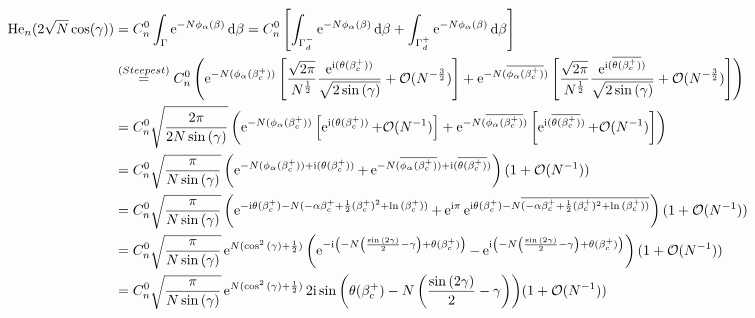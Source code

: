 \begin{equation}
 	\begin{split}
 		 \He_n(2\sqrt{N}\cos(\gamma)) &= C_n^0 \int_{\Gamma}  \ee^{-N \phi_\alpha(\beta)} \dd \beta  = C_n^0  \left[ \int_{\Gamma_d^-}  \ee^{-N \phi_\alpha(\beta)} \dd \beta + \int_{\Gamma_d^+}  \ee^{-N \phi_\alpha(\beta)} \dd \beta  \right]\\
 		 & \stackrel{(Steepest)}{=}  
 		 C_n^0 \left(
 		 \ee^{-N(\phi_\alpha(\beta_c^+))} 
 		 \left[
 		 \frac{\sqrt{2\pi}}{N^{\frac{1}{2}}}
 		 \frac{\ee^{\ii (\theta(\beta_c^+))}}{\sqrt{2\sin{(\gamma)}}} 
 		 + \Boh(N^{-\frac{3}{2}})
 		 \right]
 		 +
 		 \ee^{-N(\overline{\phi_\alpha(\beta_c^+)})} 
 		 \left[
 		 \frac{\sqrt{2\pi}}{N^{\frac{1}{2}}}
 		 \frac{\ee^{\ii (\overline{\theta(\beta_c^+)})}}{\sqrt{2\sin{(\gamma)}}}
 		 + \Boh(N^{-\frac{3}{2}})
 		 \right]   
 		 \right)
 		 \\
 		 & = C_n^0 \sqrt{\frac{2\pi}{2N\sin{(\gamma)}}} \left(
 		 \ee^{-N(\phi_\alpha(\beta_c^+))} 
 		 \left[
 		 \ee^{\ii(\theta(\beta_c^+))} 
 		 + \Boh(N^{-1})
 		 \right]
 		 +
 		 \ee^{-N(\overline{\phi_\alpha(\beta_c^+)})} 
 		 \left[
 		 \ee^{\ii(\overline{\theta(\beta_c^+)})}
 		 + \Boh(N^{-1})
 		 \right]   
 		 \right)
 		 \\
 		 & = C_n^0 \sqrt{\frac{\pi}{N\sin{(\gamma)}}}
 		 \left(
 		 \ee^{-N(\phi_\alpha(\beta_c^+)) + \ii(\theta(\beta_c^+))} +
 		 \ee^{-N(\overline{\phi_\alpha(\beta_c^+)})+\ii(\overline{\theta(\beta_c^+)})} 
 		 \right)
 		 (1 + \Boh(N^{-1}))   
 		 \\
 		 & =  C_n^0 \sqrt{\frac{\pi}{N\sin{(\gamma)}}}
 		 \left(
 		 \ee^{-\ii\theta(\beta_c^+) - N (-\alpha \beta_c^+ + \frac{1}{2} (\beta_c^+)^2 + \ln{(\beta_c^+)}) }
 		 +
 		 \ee^{\ii \pi} \ee^{\ii\theta(\beta_c^+) - N \overline{(-\alpha \beta_c^+ + \frac{1}{2} (\beta_c^+)^2 + \ln{(\beta_c^+)}) }}  
 		 \right)
 		 (1 + \Boh(N^{-1})) 
 		 \\
 		 & =  C_n^0 \sqrt{\frac{\pi}{N\sin{(\gamma)}}} \ee^{N(\cos^2{(\gamma)} + \frac{1}{2})}
 		 \left(
 		 \ee^{-\ii \left(-N\left(\frac{\sin{(2\gamma)}}{2}-\gamma\right)+ \theta(\beta_c^+)
 		 \right)}
 		 -
 		 \ee^{\ii
 		 \left(-N\left(\frac{\sin{(2\gamma)}}{2}-\gamma\right)+\theta(\beta_c^+)
 		 \right)}  
 		 \right)
 		 (1 + \Boh(N^{-1})) 
 		 \\
 		 & =  C_n^0 \sqrt{\frac{\pi}{N\sin{(\gamma)}}} \ee^{N(\cos^2{(\gamma)} + \frac{1}{2})}
 		 2\ii \sin{\left(\theta(\beta_c^+)-N\left(\frac{\sin{(2\gamma)}}{2}-\gamma\right)\right)} 
 		 (1 + \Boh(N^{-1})) \\

\end{split}
\end{equation}
